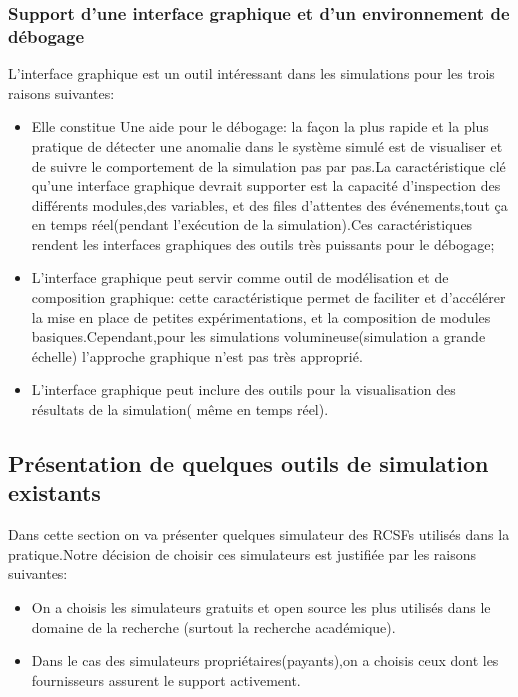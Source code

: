 \subsubsection{Support d'une interface graphique et d'un environnement de débogage}
L'interface graphique est un outil intéressant dans les simulations pour les trois raisons suivantes:
\begin{itemize}
\item Elle constitue Une aide pour le débogage:  la façon la plus rapide et la plus pratique de détecter une anomalie dans le système simulé est de visualiser et de suivre le comportement de la simulation pas par pas.La caractéristique clé qu'une interface graphique devrait supporter est la capacité d'inspection des différents modules,des variables, et des files d'attentes des événements,tout ça en temps réel(pendant l'exécution de la simulation).Ces caractéristiques rendent les interfaces graphiques des outils très puissants pour le débogage;
\item L'interface graphique peut servir comme outil de modélisation et de composition graphique:
cette caractéristique permet de faciliter et d'accélérer la mise en place de petites expérimentations, et la composition de modules basiques.Cependant,pour les simulations volumineuse(simulation a grande échelle) l'approche graphique n'est pas très approprié.
\item L'interface graphique peut inclure des outils pour la visualisation des résultats de la simulation( même en temps réel).
\end{itemize}

\subsection{Présentation de quelques outils de simulation existants}
Dans cette section on va présenter quelques simulateur des RCSFs utilisés dans la pratique.Notre décision de choisir ces simulateurs est justifiée par les raisons suivantes:
\begin{itemize}

\item On a choisis les simulateurs gratuits et open source les plus utilisés dans le domaine de la recherche (surtout la recherche académique).
\item Dans le cas des simulateurs propriétaires(payants),on a choisis ceux dont les fournisseurs assurent le support activement.

\end{itemize}

